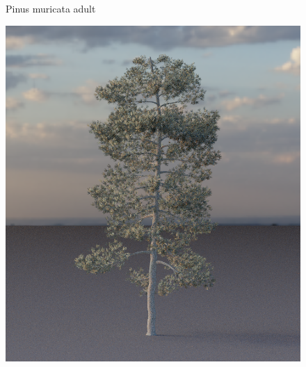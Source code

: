 \begin{figure}[t]
\begin{center}
        \begin{minipage}[c]{0.24\textwidth}
            \begin{flushleft}
                Pinus muricata adult
            \end{flushleft}
        \end{minipage}
        \begin{minipage}[c]{0.24\textwidth}
            \includegraphics[valign=c, width=\linewidth]{img/CL13a_mesh.png}
        \end{minipage}
        \begin{minipage}[c]{0.24\textwidth}

\end{minipage}
\end{center}
\end{figure}
